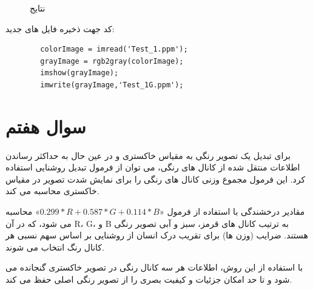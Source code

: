 \documentclass{article}
\begin{document}
	 
	 
	 \begin{figure}[H]
	 	\centering
	 	
	 	\hfill
	 	\hfill
	 	
		\caption{نتایج}

	 \end{figure}
	 
	 کد جهت ذخیره فایل های جدید:
	\begin{latin}
	\begin{verbatim}
		colorImage = imread('Test_1.ppm');
		grayImage = rgb2gray(colorImage);
		imshow(grayImage);
		imwrite(grayImage,'Test_1G.ppm');
	\end{verbatim}
		\end{latin}
	
	
	\section{سوال هفتم}
	برای تبدیل یک تصویر رنگی به مقیاس خاکستری و در عین حال به حداکثر رساندن اطلاعات منتقل شده از کانال های رنگی، می توان از فرمول تبدیل روشنایی استفاده کرد. این فرمول مجموع وزنی کانال های رنگی را برای نمایش شدت تصویر در مقیاس خاکستری محاسبه می کند.\cite{8}
	
	مقادیر درخشندگی با استفاده از فرمول «$0.299 * R + 0.587 * G + 0.114 * B$» محاسبه می شود، که در آن R، G، و B به ترتیب کانال های قرمز، سبز و آبی تصویر رنگی هستند. ضرایب (وزن ها) برای تقریب درک انسان از روشنایی بر اساس سهم نسبی هر کانال رنگ انتخاب می شوند.\cite{8}
	
	با استفاده از این روش، اطلاعات هر سه کانال رنگی در تصویر خاکستری گنجانده می شود و تا حد امکان جزئیات و کیفیت بصری را از تصویر رنگی اصلی حفظ می کند.\cite{8}
	
\end{document}

